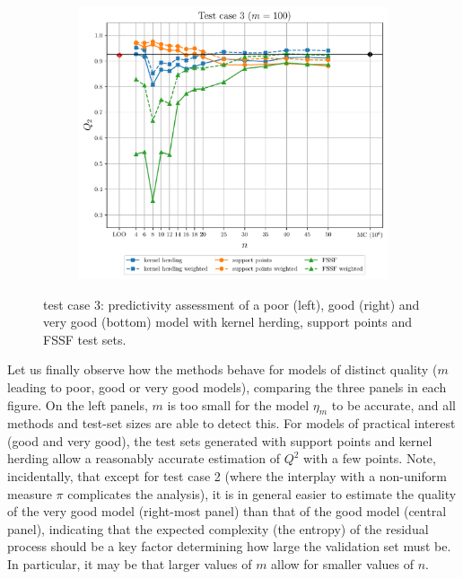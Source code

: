 \begin{figure}
\begin{subfigure}[b]{0.49\linewidth}
  \end{subfigure}
  \\
  \centering
  \begin{subfigure}[b]{0.49\linewidth}
    \centering
    \includegraphics[width=\linewidth]{./part2/figures/SIS/gsobol_learnsize_100.pdf}
  \end{subfigure}
  \caption{test case 3: predictivity assessment of a poor (left), good (right) and very good (bottom) model with kernel herding, support points and FSSF test sets.}
  \label{fig:gsobol_benchmark}
\end{figure}

Let us finally observe how the methods behave for models of distinct quality ($m$ leading to poor, good or very good models), comparing the three panels in each figure. 
On the left panels, $m$ is too small for the model $\eta_m$ to be accurate, and all methods and test-set sizes are able to detect this. 
For models of practical interest (good and very good), the test sets generated with support points and kernel herding allow a reasonably accurate estimation of $Q^2$ with a few points. 
Note, incidentally, that except for test case 2 (where the interplay with a non-uniform measure $\pi$ complicates the analysis), it is in general easier to estimate the quality of the very good model (right-most panel) than that of the good model (central panel), indicating that the expected complexity (the entropy) of the residual process should be a key factor determining how large the validation set must be. 
In particular, it may be that larger values of $m$ allow for smaller values of $n$.





